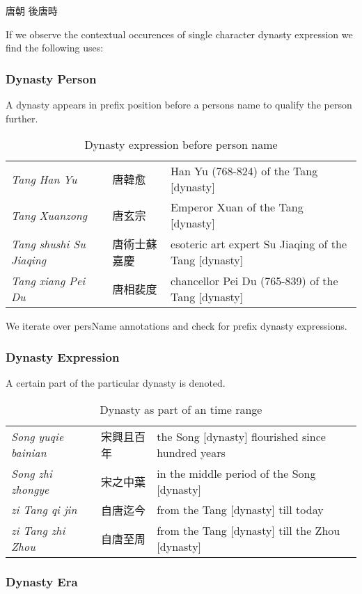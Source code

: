 \documentclass[12pt, draft]{article}
\begin{document}
唐朝
後唐時

If we observe the contextual occurences of single character dynasty expression we find the
following uses:

\subsubsection{Dynasty Person}
A dynasty appears in prefix position before a persons name to qualify the person further.

{\footnotesize
\begin{table}[h]
\caption{Dynasty expression before person name}
\begin{tabular}{lll}
\emph{Tang Han Yu} & 唐韓愈 & Han Yu (768-824) of the Tang [dynasty] \\
\emph{Tang Xuanzong} & 唐玄宗 & Emperor Xuan of the Tang [dynasty] \\
\emph{Tang shushi Su Jiaqing} &  唐術士蘇嘉慶 & esoteric art expert Su Jiaqing of the Tang [dynasty] \\
\emph{Tang xiang Pei Du} &  唐相裴度 & chancellor Pei Du (765-839) of the Tang [dynasty] \\
\end{tabular}
\end{table}
}

We iterate over persName annotations and check for prefix dynasty expressions.

\subsubsection{Dynasty Expression}
A certain part of the particular dynasty is denoted.

{\footnotesize
\begin{table}[h]
\caption{Dynasty as part of an time range}
\begin{tabular}{lll}
\emph{Song yuqie bainian} & 宋興且百年 & the Song [dynasty] flourished since hundred years \\
\emph{Song zhi zhongye} & 宋之中葉 & in the middle period of the Song [dynasty] \\
\emph{zi Tang qi jin} & 自唐迄今 & from the Tang [dynasty] till today \\
\emph{zi Tang zhi Zhou} & 自唐至周 & from the Tang [dynasty] till the Zhou [dynasty] \\
\end{tabular}
\end{table}
}

\subsubsection{Dynasty Era}
\end{document}
